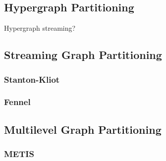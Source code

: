 \documentclass[11pt]{article}
\begin{document}
\subsection{Hypergraph Partitioning}
Hypergraph streaming?
\cite{catalyurek1999hypergraph}

\subsection{Streaming Graph Partitioning}
\subsubsection{Stanton-Kliot}
\cite{DBLP:journals/corr/abs-1212-1121}
\cite{Stanton:2012:SGP:2339530.2339722}

\subsubsection{Fennel}
\cite{tsourakakis2012fennel}

\subsection{Multilevel Graph Partitioning}
\subsubsection{METIS}
\cite{karypis1998multilevel}





\end{document}
